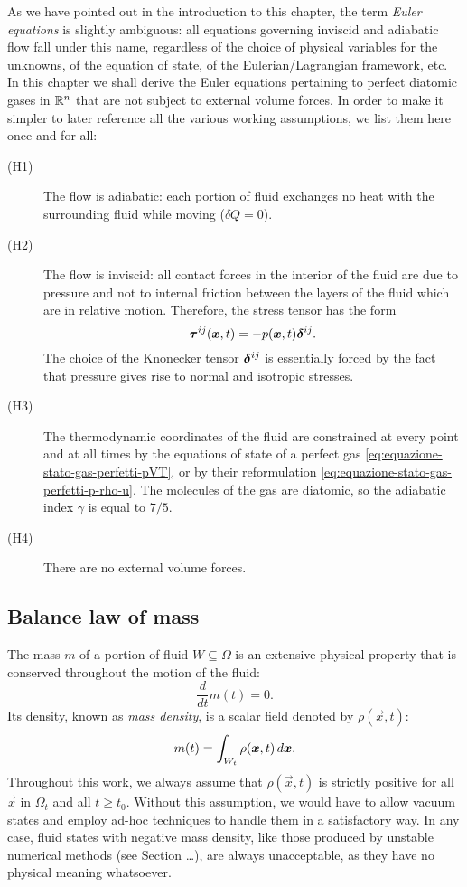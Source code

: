 As we have pointed out in the introduction to this chapter,
the term \emph{Euler equations} is slightly ambiguous: all equations
governing inviscid and adiabatic flow fall under this name,
regardless of the choice of physical variables for the unknowns,
of the equation of state, of the Eulerian/Lagrangian framework, etc.
In this chapter we shall derive the Euler equations pertaining
to perfect diatomic gases in $\mathbb{R}^n$ that are not subject to external
volume forces. In order to make it simpler to later reference all the
various working assumptions, we list them here once and for all:
\begin{description}
\item[(H1)] The flow is adiabatic: each portion of fluid exchanges
	no heat with the surrounding fluid while moving ($\delta Q = 0$).
\item[(H2)] The flow is inviscid: all contact forces in the interior
	of the fluid are due to pressure and not to internal friction
	between the layers of the fluid which are in relative motion.
	Therefore, the stress tensor has the form
	\[
	\bm{\tau}^{ij}(\bm{x},t) = -p(\bm{x},t) \bm{\delta}^{ij}.
	\]
	The choice of the Knonecker tensor $\bm{\delta}^{ij}$ is essentially forced
	by the fact that pressure gives rise to normal and isotropic stresses.
\item[(H3)] The thermodynamic coordinates of the fluid are constrained
	at every point and at all times by the equations of state
	of a perfect gas \eqref{eq:equazione-stato-gas-perfetti-pVT},
	or by their reformulation \eqref{eq:equazione-stato-gas-perfetti-p-rho-u}.
	The molecules of the gas are diatomic, so the adiabatic index
	$\gamma$ is equal to $7/5$.
\item[(H4)] There are no external volume forces.
\end{description}

\subsection*{Balance law of mass}

The mass $m$ of a portion of fluid $W \subseteq \Omega$ is an
extensive physical property that is conserved throughout the motion of the fluid:
\[
\frac{d}{dt} m(t) = 0.
\]
Its density, known as \emph{mass density}, is a scalar field
denoted by $\rho(\vec{x},t)$:
\[
m(t) = \int_{W_t} \rho(\bm{x},t) \, d\bm{x}.
\]
Throughout this work, we always assume that $\rho(\vec{x},t)$ is strictly
positive for all $\vec{x}$ in $\Omega_t$ and all $t \geq t_0$.
Without this assumption, we would have to allow vacuum states
and employ ad-hoc techniques to handle them in a satisfactory way.
In any case, fluid states with negative mass density, like those
produced by unstable numerical methods (see Section \dots), %
are always unacceptable, as they have no physical meaning whatsoever.

